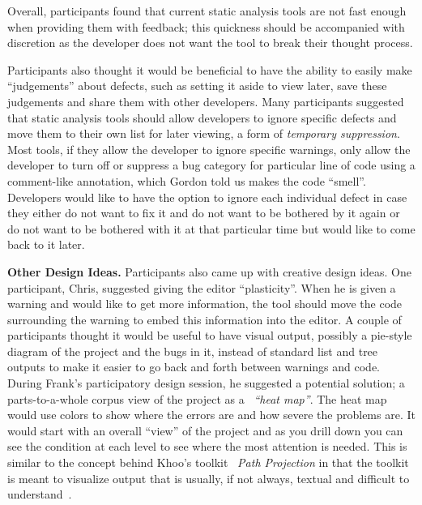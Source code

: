 Overall, participants found that current static analysis tools are not fast
enough when providing them with feedback; this quickness should be accompanied
with discretion as the developer does not want the tool to break their thought
process.

Participants also thought it would be beneficial to have the ability to
easily make ``judgements'' about defects, such as setting it aside to view
later, save these judgements and share them with other developers. Many participants suggested that static analysis tools should allow developers to
ignore specific defects and move them to their own list for later viewing, a
form of \emph{temporary suppression}. Most tools, if they allow the developer to
ignore specific warnings, only allow the developer to turn off or suppress a bug
category for particular line of code using a comment-like annotation, which
Gordon told us makes the code ``smell''. Developers would like to have the
option to ignore each individual defect in case they either do not want to fix
it and do not want to be bothered by it again or do not want to be bothered with
it at that particular time but would like to come back to it later.

\textbf{Other Design Ideas.} Participants also came up with creative design
ideas. One participant, Chris, suggested giving the editor ``plasticity''. When
he is given a warning and would like to get more information, the tool should
move the code surrounding the warning to embed this information into the editor.
A couple of participants thought it would be useful to have visual output,
possibly a pie-style diagram of the project and the bugs in it, instead of
standard list and tree outputs to make it easier to go back and forth between
warnings and code. During Frank's participatory design session, he suggested a
potential solution; a parts-to-a-whole corpus view of the project as a
~\emph{``heat map''}. The heat map would use colors to show where the errors are
and how severe the problems are. It would start with an overall ``view'' of the
project and as you drill down you can see the condition at each level to see
where the most attention is needed. This is similar to the concept behind Khoo's
toolkit ~\emph{Path Projection} in that the toolkit is meant to visualize output
that is usually, if not always, textual and difficult to
understand~\cite{Khoo:2008:PathProjection}.


